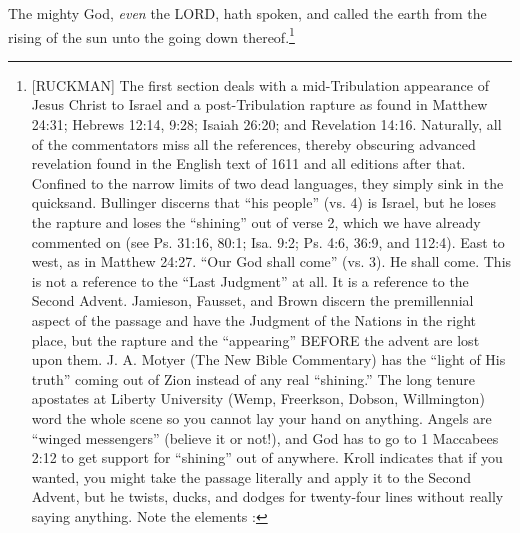 \textcolor[rgb]{0.00,0.00,1.00}{The mighty God, \emph{even} the LORD, hath spoken, and called the earth from the rising of the sun unto the going down thereof.}\footnote{[RUCKMAN] The first section deals with a mid-Tribulation appearance of Jesus Christ to Israel and a post-Tribulation rapture as found in Matthew 24:31; Hebrews 12:14, 9:28; Isaiah 26:20; and Revelation 14:16. Naturally, all of the commentators miss all the references, thereby obscuring advanced revelation found in the English text of 1611 and all editions after that. Confined to the narrow limits of two dead languages, they simply sink in the quicksand. Bullinger discerns that “his people” (vs. 4) is Israel, but he loses the rapture and loses the ``shining'' out of verse 2, which we have already commented on (see Ps. 31:16, 80:1; Isa. 9:2; Ps. 4:6, 36:9, and 112:4). East to west, as in Matthew 24:27. “Our God shall come” (vs. 3). He shall come. This is not a reference to the “Last Judgment” at all. It is a reference to the Second Advent. Jamieson, Fausset, and Brown discern the premillennial aspect of the passage and have the Judgment of the Nations in the right place, but the rapture and the “appearing” BEFORE the advent are lost upon them. J. A. Motyer (The New Bible Commentary) has the “light of His truth” coming out of Zion instead of any real “shining.” The long tenure apostates at Liberty University (Wemp, Freerkson, Dobson, Willmington) word the whole scene so you cannot lay your hand on anything. Angels are “winged messengers” (believe it or not!), and God has to go to 1 Maccabees 2:12 to get support for “shining” out of anywhere. Kroll indicates that if you wanted, you might take the passage literally and apply it to the Second Advent, but he twists, ducks, and dodges for twenty-four lines without really saying anything. Note the elements \cite{Ruckman1992PsalmsV1}:
}
